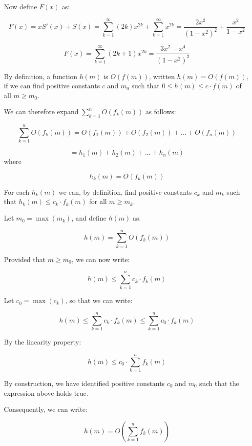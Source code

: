 \documentclass[a4paper,12pt]{article}
\begin{document}
Now define $F(x)$ as:

\[ F(x) = xS'(x) + S(x) = \sum_{k=1}^\infty (2k)x^{2k} + \sum_{k=1}^\infty x^{2k} = \frac{2x^2}{(1-x^2)^2} + \frac{x^2}{1-x^2} \]

\[ F(x) = \sum_{k=1}^\infty(2k+1) x^{2k} = \frac{3x^2 - x^4}{(1-x^2)^2} \] 


By definition, a function $h(m)$ is $O(f(m))$, written  $h(m) = O(f(m))$, if we can find positive constants $c$ and $m_0$ such that $0 \le h(m) \le c \cdot f(m)$ of all $m \ge m_0$.

We can therefore expand $\sum_{k=1}^n O(f_k(m))$ as follows:

\[ \sum_{k=1}^n O\left(f_k(m)\right) = O(f_1(m)) + O(f_2(m)) + ... + O(f_n(m)) \]

\[ = h_1(m) + h_2(m) + ... + h_n(m) \]
where

\[ h_k(m) = O(f_k(m)) \]

For each $h_k(m)$ we can, by definition, find positive constants $c_k$ and $m_k$ such that $h_k(m) \le c_k \cdot f_k(m)$ for all $m \ge m_k$.

Let $m_0 = \max\left(m_k\right)$, and define $h(m)$ as:

\[ h(m) = \sum_{k=1}^n O \left(f_k(m)\right) \]

Provided that $m \ge m_0$, we can now write:

\[ h(m) \le \sum_{k=1}^n c_k \cdot f_k(m) \]

Let $c_0 = \max(c_k)$, so that we can write:

\[ h(m) \le \sum_{k=1}^n c_k \cdot f_k(m) \le \sum_{k=1}^n c_0 \cdot f_k(m) \]

By the linearity property:

\[ h(m) \le c_0 \cdot  \sum_{k=1}^n f_k(m) \]

By construction, we have identified positive constants $c_0$ and $m_0$ such that the expression above holds true. 

Consequently, we can write:

\[ h(m) = O\left(\sum_{k=1}^n f_k(m) \right)\]
\end{document}
